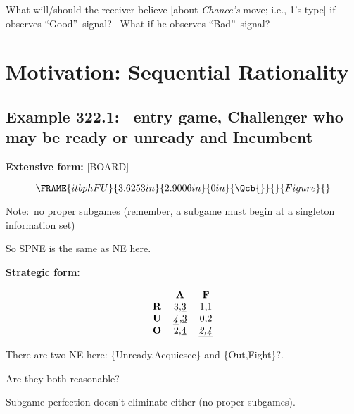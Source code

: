 \documentclass{article}
\begin{document}
What will/should the receiver believe [about \textit{Chance's }move; i.e.,
1's type] if observes \textquotedblleft Good\textquotedblright\ signal? \
What if he observes \textquotedblleft Bad\textquotedblright\ signal?

\bigskip

\section{Motivation: Sequential Rationality}

\subsection{Example 322.1: \ entry game, Challenger who may be ready or
unready and Incumbent}

\textbf{Extensive form: }[BOARD]\textbf{\bigskip }

\begin{equation}
\FRAME{itbphFU}{3.6253in}{2.9006in}{0in}{\Qcb{{}}}{}{Figure}{\special%
{language "Scientific Word";type "GRAPHIC";maintain-aspect-ratio
TRUE;display "USEDEF";valid_file "T";width 3.6253in;height 2.9006in;depth
0in;original-width 5.6886in;original-height 3.5201in;cropleft "0";croptop
"1";cropright "1";cropbottom "0";tempfilename
'JSY1RZ09.wmf';tempfile-properties "XPR";}}
\end{equation}

Note:\ no proper subgames (remember, a subgame must begin at a singleton
information set)

So SPNE is the same as NE here.

\bigskip

\textbf{Strategic form:}

\[
\begin{tabular}{ccc}
& \textbf{A} & \textbf{F} \\ 
\textbf{R} & 3,\underline{3} & 1,1 \\ 
\textbf{U} & \underline{\textit{4}},\underline{3} & 0,2 \\ 
\textbf{O} & 2,\underline{4} & \underline{\textit{2,4}}%
\end{tabular}%
\]

\bigskip

There are two NE here: \{Unready,Acquiesce\} and \{Out,Fight\}?.\ 

Are they both reasonable?

\bigskip

Subgame perfection doesn't eliminate either (no proper subgames).
\end{document}
